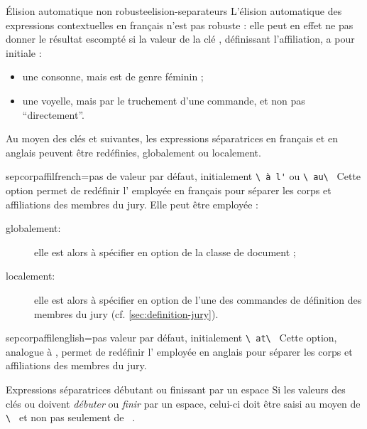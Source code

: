 \begin{dbwarning}{Élision automatique non robuste}{elision-separateurs}
  L'élision automatique des expressions contextuelles en français n'est pas
  robuste : elle peut en effet ne pas donner le résultat escompté si la valeur
  de la clé , définissant l'affiliation, a pour initiale :
  \begin{itemize}
  \item une consonne, mais est de genre féminin ;
  \item une voyelle, mais par le truchement d'une commande\commandeacronyme, et
    non pas \enquote{directement}.
  \end{itemize}
\end{dbwarning}

Au moyen des clés  et 
suivantes, les expressions séparatrices en français et en anglais peuvent être
redéfinies, globalement ou localement.

\begin{docKey}{sepcorpaffilfrench}{=}{pas de valeur par
    défaut, initialement \lstinline[showspaces]+\ à l'+ ou \lstinline[showspaces]+\ au\ +}
  Cette option permet de redéfinir l' employée en français
  pour séparer les corps et affiliations des membres du jury. Elle peut
  être employée :
  \begin{description}
  \item[globalement:] elle est alors à spécifier en option de la classe de
    document ;
  \item[localement:] elle est alors à spécifier en option de l'une des
    commandes de définition des membres du jury (cf.
    \vref{sec:definition-jury}).
  \end{description}
\end{docKey}

\begin{docKey}{sepcorpaffilenglish}{=}{pas valeur par
    défaut, initialement \lstinline[showspaces]+\ at\ +}
  Cette option, analogue à , permet de redéfinir
  l' employée en anglais pour séparer les corps et
  affiliations des membres du jury.
\end{docKey}

\begin{dbwarning}{Expressions séparatrices débutant ou finissant par un espace}{}
  Si les valeurs des clés  ou
   doivent \emph{débuter} ou \emph{finir} par un
  espace, celui-ci doit être saisi au moyen de
  \lstinline[showspaces]+\ +
  et non pas seulement de
  \lstinline[showspaces]+ +.
\end{dbwarning}

